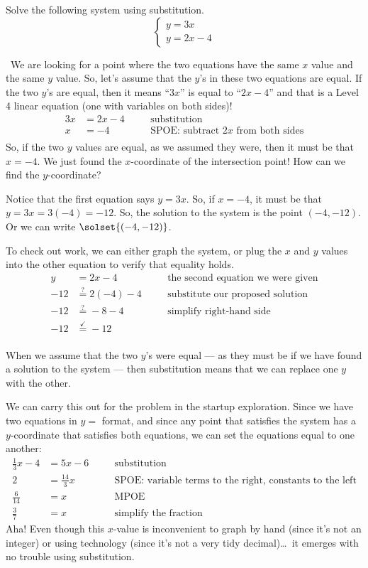 \begin{boxedex}
Solve the following system using substitution.
\[
\left\{%
\begin{array}{l}
y=3x\\
y=2x-4
\end{array}
\right.
\] 

\exsoln\ We are looking for a point where the two equations have the same $x$ value and the same $y$ value. So, let's assume that the $y$'s in these two equations  are equal. If the two $y$'s are equal, then it means ``$3x$'' is equal to ``$2x-4$'' and that is a Level 4 linear equation (one with variables on both sides)!
\[\begin{aligned}
3x &= 2x -4
&& \quad\text{substitution}\\
x &= -4
&& \quad\text{SPOE: subtract $2x$ from both sides}\\
\end{aligned}\]
So, if the two $y$ values are equal, as we assumed they were, then it must be that $x=-4$. We just found the $x$-coordinate of the intersection point! How can we find the $y$-coordinate?

Notice that the first equation says $y = 3x$. So, if $x=-4$, it must be that $y = 3x = 3(-4) = -12$. So, the solution to the system is the point $(-4, -12)$. Or we can write $\solset{(-4,-12)}$.

To check out work, we can either graph the system, or plug the $x$ and $y$ values into the other equation to verify that equality holds.
\[\begin{aligned}
y &= 2x -4
&& \quad\text{the second equation we were given}\\
-12 &\overset{?}{=} 2(-4)-4
&& \quad\text{substitute our proposed solution}\\
-12 &\overset{?}{=} -8-4
&& \quad\text{simplify right-hand side}\\
-12 &\overset{\checkmark}{=} -12
&& \quad\text{}\\
\end{aligned}\]
\end{boxedex}

When we assume that the two $y$'s were equal --- as they must be if we have found a solution to the system --- then substitution means that we can replace one $y$ with the other.

We can carry this out for the problem in the startup exploration. Since we have two equations in $y=$ format, and since any point that satisfies the system has a $y$-coordinate that satisfies both equations, we can set the equations equal to one another:
\[\begin{aligned}
\frac{1}{3}x - 4 &= 5x - 6
&& \quad\text{substitution}\\[1ex]
2 &= \frac{14}{3}x
&& \quad\text{SPOE: variable terms to the right, constants to the left}\\[1ex]
\frac{6}{14} &= x
&& \quad\text{MPOE}\\[1ex]
\frac{3}{7} &= x
&& \quad\text{simplify the fraction}
\end{aligned}\]
Aha! Even though this $x$-value is inconvenient to graph by hand (since it's not an integer) or using technology (since it's not a very tidy decimal)\ldots\ it emerges with no trouble using substitution.

